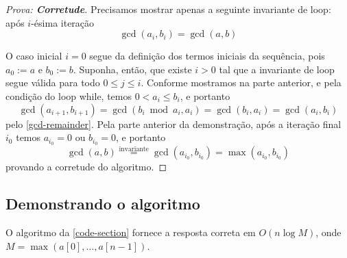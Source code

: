 \documentclass{article}
\begin{document}
\begin{proof}[Prova: \textbf{Corretude}]
    Precisamos mostrar apenas a seguinte invariante de loop: após \(i\)-ésima iteração
    \[\gcd(a_i, b_i) = \gcd(a, b)\]

    O caso inicial \(i = 0\) segue da definição dos termos iniciais da sequência, pois \(a_0 := a\) e \(b_0 := b\). Suponha, então, que existe \(i > 0\) tal que a invariante de loop segue válida para todo \(0 \leq j \leq i\). Conforme mostramos na parte anterior, e pela condição do loop while, temos \(0 < a_i \leq b_i\), e portanto
    \[\gcd(a_{i+1}, b_{i+1}) = \gcd(b_i \bmod a_i, a_i) = \gcd(b_i, a_i) = \gcd(a_i, b_i)\]
    pelo \cref{gcd-remainder}. Pela parte anterior da demonstração, após a iteração final \(i_0\) temos \(a_{i_0} = 0\) ou \(b_{i_0} = 0\), e portanto
    \[\gcd(a, b) \overset{\text{invariante}}{=} \gcd(a_{i_0}, b_{i_0}) = \max(a_{i_0}, b_{i_0})\]
    provando a corretude do algoritmo.    
\end{proof}


\subsection{Demonstrando o algoritmo}

\begin{theorem}\label{main-result-correctness}
    O algoritmo da \cref{code-section} fornece a resposta correta em \(O(n \log M)\), onde \(M = \max(a[0], \dotsc, a[n-1])\).
\end{theorem}
\end{document}

